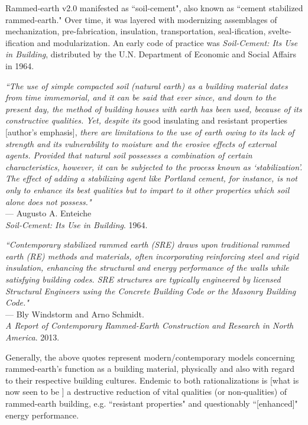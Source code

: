 Rammed-earth v2.0 manifested as ``soil-cement", also known as ``cement stabilized rammed-earth." Over time, it was layered with modernizing assemblages of mechanization, pre-fabrication, insulation, transportation, seal-ification, svelte-ification and modularization. An early code of practice was \textit{Soil-Cement: Its Use in Building}, distributed by the U.N. Department of Economic and Social Affairs in 1964.

\begin{flushright}
\small{
\textit{``The use of simple compacted soil (natural earth) as a building material dates from time immemorial, and it can be said that ever since, and down to the present day, the method of building houses with earth has been used, because of its constructive qualities. Yet, despite its} good insulating and resistant properties [author's emphasis], \textit{there are limitations to the use of earth owing to its lack of strength and its vulnerability to moisture and the erosive effects of external agents. Provided that natural soil possesses a combination of certain characteristics, however, it can be subjected to the process known as `stabilization'. The effect of adding a stabilizing agent like Portland cement, for instance, is not only to enhance its best qualities but to impart to it other properties which soil alone does not possess."}}\\ --- Augusto A. Enteiche \\ \textit{Soil-Cement: Its Use in Building}. 1964.
\end{flushright}


\begin{flushright}
\small{
\textit{
``Contemporary stabilized rammed earth (SRE) draws upon traditional rammed earth (RE) methods and materials, often incorporating reinforcing steel and rigid insulation, enhancing the structural and energy performance of the walls while satisfying building codes. SRE structures are typically engineered by licensed Structural Engineers using the Concrete Building Code or the Masonry Building Code."}} \\ --- Bly Windstorm and Arno Schmidt. \\ \textit{A Report of Contemporary Rammed-Earth Construction and Research in North America}. 2013.
\end{flushright}


Generally, the above quotes represent modern/contemporary models concerning rammed-earth's function as a building material, physically and also with regard to their respective building cultures. Endemic to both rationalizations is [what is now seen to be \cite{MOECONVERGENCE}] a destructive reduction of vital qualities (or non-qualities) of rammed-earth building, e.g. ``resistant properties" and questionably ``[enhanced]" energy performance.

